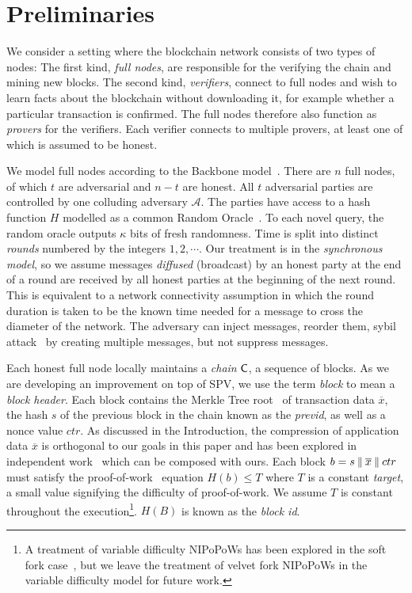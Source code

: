 \section{Preliminaries}\label{sec:preliminaries}

We consider a setting where the blockchain network consists of two
types of nodes: The first kind, \emph{full nodes}, are responsible for the
verifying the chain and mining new blocks. The
second kind, \emph{verifiers}, connect to full nodes and wish to learn facts
about the blockchain without downloading it, for example whether a particular
transaction is confirmed. The full nodes therefore also function as
\emph{provers} for the verifiers. Each verifier connects to multiple provers, at
least one of which is assumed to be honest.

We model full nodes according to the Backbone model~\cite{backbone}. There are
$n$ full nodes, of which $t$ are adversarial and $n - t$ are honest. All $t$
adversarial parties are controlled by one colluding adversary $\mathcal{A}$. The
parties have access to a hash function $H$ modelled as a common Random
Oracle~\cite{ro}. To each novel query, the random oracle outputs $\kappa$ bits
of fresh randomness. Time is split into distinct \emph{rounds} numbered by the
integers $1, 2, \cdots$. Our treatment is in the \emph{synchronous model}, so we
assume messages \emph{diffused} (broadcast) by an honest party at the end of a
round are received by all honest parties at the beginning of the next round.
This is equivalent to a network connectivity assumption in which the round
duration is taken to be the known time needed for a message to cross the
diameter of the network. The adversary can inject messages, reorder them, sybil
attack~\cite{sybil} by creating multiple messages, but not suppress messages.

Each honest full node locally maintains a \emph{chain} $\mathsf{C}$, a sequence of
blocks. As we are developing an improvement on top of SPV, we
use the term \emph{block} to mean a
\emph{block header}. Each block contains the Merkle Tree root~\cite{merkle} of
transaction data $\overline{x}$, the hash $s$ of the previous block in the chain
known as the \emph{previd}, as well as a nonce value $ctr$. As discussed in the
Introduction, the compression of application data $\overline{x}$ is orthogonal
to our goals in this paper and has been explored in independent
work~\cite{edrax} which can be composed with ours. Each block $b = s \mathbin{\|}
\overline{x} \mathbin{\|} ctr$ must satisfy the proof-of-work~\cite{pow} equation $H(b) \leq T$
where $T$ is a constant \emph{target}, a small value signifying the difficulty
of proof-of-work. We assume $T$ is constant throughout the execution\footnote{A
treatment of variable difficulty NIPoPoWs has been explored in the soft fork
case~\cite{dionyziz}, but we leave the treatment of velvet fork NIPoPoWs in the
variable difficulty model for future work.}. $H(B)$ is
known as the \emph{block id}.


